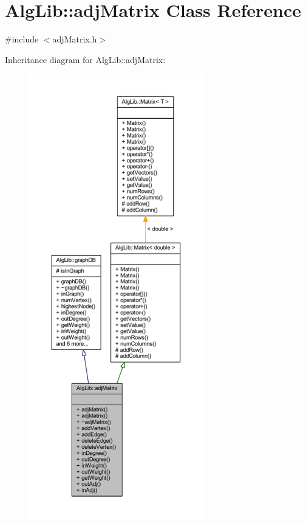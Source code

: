 \hypertarget{class_alg_lib_1_1adj_matrix}{}\section{Alg\+Lib\+:\+:adj\+Matrix Class Reference}
\label{class_alg_lib_1_1adj_matrix}


{\ttfamily \#include $<$adj\+Matrix.\+h$>$}



Inheritance diagram for Alg\+Lib\+:\+:adj\+Matrix\+:\nopagebreak
\begin{figure}[H]
\begin{center}
\leavevmode
\includegraphics[height=550pt]{class_alg_lib_1_1adj_matrix__inherit__graph}
\end{center}
\end{figure}


